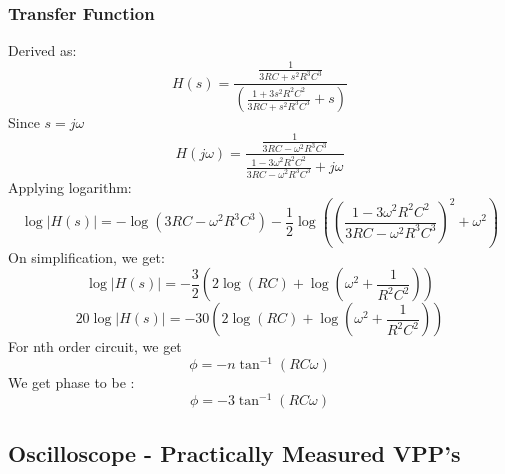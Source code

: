 \documentclass[a4paper,12pt]{article}
\begin{document}
\subsubsection{Transfer Function}
Derived as:
\begin{equation}
    H(s) = \frac{\frac{1}{3RC+s^2R^3C^3}}{(\frac{1+3s^2R^2C^2}{3RC+s^2R^3C^3}+s)}
\end{equation}
Since $s=j\omega$
\begin{equation}
    H(j\omega) = \frac{\frac{1}{3RC-\omega^2R^3C^3}}{\frac{1-3\omega^2R^2C^2}{3RC-\omega^2R^3C^3}+j\omega}
\end{equation}
Applying logarithm:
\begin{equation}
\log \left| H(s) \right| = -\log \left( 3RC - \omega^2 R^3 C^3 \right) - \frac{1}{2} \log \left( \left( \frac{1 - 3\omega^2 R^2 C^2}{3RC - \omega^2 R^3 C^3} \right)^2 + \omega^2 \right)
\end{equation}
On simplification, we get:
\begin{equation}
\log \left| H(s) \right|=-\frac{3}{2} \left( 2\log (RC) + \log \left( \omega^2 + \frac{1}{R^2C^2} \right) \right)
\end{equation}
\begin{equation}
    20\log \left| H(s) \right|=-30 \left( 2\log (RC) + \log \left( \omega^2 + \frac{1}{R^2C^2} \right) \right)
\end{equation}
For nth order circuit, we get 
\begin{equation}
    \phi = -n\tan^{-1}(RC\omega)
\end{equation}
We get phase to be :
\begin{equation}
    \phi =-3\tan^{-1}(RC\omega)
\end{equation}

\subsection{Oscilloscope - Practically Measured VPP's}
\end{document}
